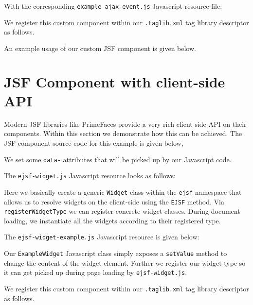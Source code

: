 With the corresponding \texttt{example-ajax-event.js} Javascript resource file:


We register this custom component within our \texttt{.taglib.xml} tag library descriptor as follows.


An example usage of our custom JSF component is given below.


\section{JSF Component with client-side API}
Modern JSF libraries like PrimeFaces provide a very rich client-side API on their components.
Within this section we demonstrate how this can be achieved.
The JSF component source code for this example is given below,

We set some \texttt{data-} attributes that will be picked up by our Javascript code.

The \texttt{ejsf-widget.js} Javascript resource looks as follows:

Here we basically create a generic \texttt{Widget} class within the \texttt{ejsf} namespace that allows us to resolve widgets on the client-side using the \texttt{EJSF} method.
Via \texttt{registerWidgetType} we can register concrete widget classes.
During document loading, we instantiate all the widgets according to their registered type.

The \texttt{ejsf-widget-example.js} Javascript resource is given below:

Our \texttt{ExampleWidget} Javascript class simply exposes a \texttt{setValue} method to change the content of the widget element.
Further we register our widget type so it can get picked up during page loading by \texttt{ejsf-widget.js}.

We register this custom component within our \texttt{.taglib.xml} tag library descriptor as follows.


